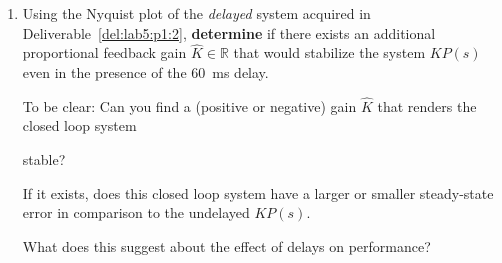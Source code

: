 \begin{deliverable}[label={lab5:report}]
\begin{enumerate}[label={(\arabic*)}]
{      In 4G/LTE communication networks the mean round trip time of a packet is around \SI{50}{\milli\second}.

      \textbf{Would} your uncompensated system be stable if the feedback loop involved communication over a similar wireless network with comparable delays?
      If not, would the compensated system be stable?
      \label{lab5:report:q6}
    }
    \item{%
      Using the Nyquist plot of the \emph{delayed} system acquired in Deliverable~\ref{del:lab5:p1:2}, \textbf{determine} if there exists an additional proportional feedback gain \(\hat{K} \in \mathbb{R}\) that would stabilize the system \(K P(s)\) even in the presence of the \SI{60}{\milli\second} delay.

      To be clear: Can you find a (positive or negative) gain \(\hat{K}\) that renders the closed loop system
      \begin{center}
      \end{center}
      stable?

      If it exists, does this closed loop system have a larger or smaller steady-state error in comparison to the undelayed \(K P(s).\)

      What does this suggest about the effect of delays on performance?
      \label{lab5:report:q7}
    }
  \end{enumerate}
\end{deliverable}

